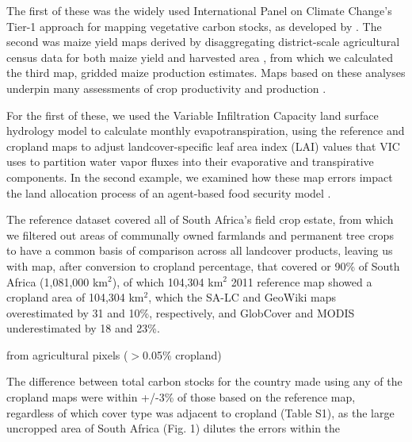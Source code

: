 \documentclass{pnastwo}
\begin{document}
\begin{article}
\begin{materials}
The first of these was the widely used International Panel on Climate Change's Tier-1 approach for mapping vegetative carbon stocks, as developed by \cite{ruesch_new_2008}. The second was maize yield maps derived by disaggregating district-scale agricultural census data for both maize yield and harvested area \cite[following][]{monfreda_farming_2008,ramankutty_farming_2008}, from which we calculated the third map, gridded maize production estimates. Maps based on these analyses underpin many assessments of crop productivity and production \cite[e.g.][]{foley_solutions_2011,licker_mind_2010}.  

For the first of these, we used the Variable Infiltration Capacity \cite{liang_simple_1994} land surface hydrology model to calculate monthly evapotranspiration, using the reference and cropland maps to adjust landcover-specific leaf area index (LAI) values that VIC uses to partition water vapor fluxes into their evaporative and transpirative components. In the second example, we examined how these map errors impact the land allocation process of an agent-based food security model \cite{chen_dependency_2013}. 

The reference dataset covered all of South Africa's field crop estate, from which we filtered out areas of communally owned farmlands and permanent tree crops to have a common basis of comparison across all landcover products, leaving us with map, after conversion to cropland percentage, that covered or 90\% of South Africa (1,081,000 km$^2$), of which 104,304 km$^2$ 2011 reference map showed a cropland area of 104,304 km$^2$, which the SA-LC and GeoWiki maps overestimated by 31 and 10\%, respectively, and GlobCover and MODIS underestimated by 18 and 23\%.  

from agricultural pixels ($>$0.05\% cropland)

The difference between total carbon stocks for the country made using any of the cropland maps were within +/-3\% of those based on the reference map, regardless of which cover type was adjacent to cropland (Table S1), as the large uncropped area of South Africa (Fig. 1) dilutes the errors within the 


\end{materials}
\end{article}
\end{document}
